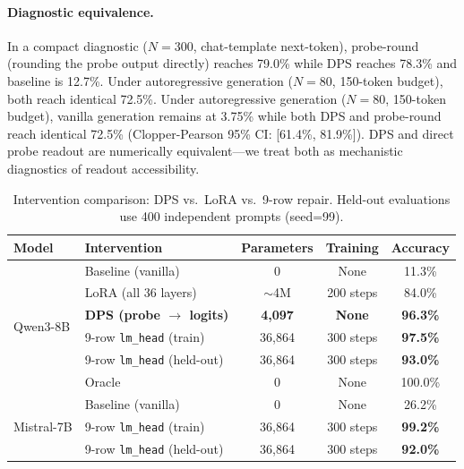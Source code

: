 \documentclass{article}
\begin{document}
\paragraph{Diagnostic equivalence.}
In a compact diagnostic ($N=300$, chat-template next-token), probe-round (rounding the probe output directly) reaches 79.0\% while DPS reaches 78.3\% and baseline is 12.7\%.
Under autoregressive generation ($N=80$, 150-token budget), both reach identical 72.5\%.
Under autoregressive generation ($N=80$, 150-token budget), vanilla generation
remains at 3.75\% while both DPS and probe-round reach identical 72.5\%
(Clopper-Pearson 95\% CI: [61.4\%, 81.9\%]).
DPS and direct probe readout are numerically equivalent---we treat both as mechanistic diagnostics of readout accessibility.

\begin{table}[h]
\centering
\caption{Intervention comparison: DPS vs.\ LoRA vs.\ 9-row repair.
Held-out evaluations use 400 independent prompts (seed=99).}
\label{tab:intervention_comparison}
\begin{tabular}{llccc}
\toprule
Model & Intervention & Parameters & Training & Accuracy \\
\midrule
\multirow{6}{*}{Qwen3-8B} & Baseline (vanilla) & 0 & None & 11.3\% \\
 & LoRA (all 36 layers) & $\sim$4M & 200 steps & 84.0\% \\
 & \textbf{DPS (probe $\to$ logits)} & \textbf{4{,}097} & \textbf{None} & \textbf{96.3\%} \\
 & 9-row \texttt{lm\_head} (train) & 36{,}864 & 300 steps & \textbf{97.5\%} \\
 & 9-row \texttt{lm\_head} (held-out) & 36{,}864 & 300 steps & \textbf{93.0\%} \\
 & Oracle & 0 & None & 100.0\% \\
\midrule
\multirow{3}{*}{Mistral-7B} & Baseline (vanilla) & 0 & None & 26.2\% \\
 & 9-row \texttt{lm\_head} (train) & 36{,}864 & 300 steps & \textbf{99.2\%} \\
 & 9-row \texttt{lm\_head} (held-out) & 36{,}864 & 300 steps & \textbf{92.0\%} \\
\bottomrule
\end{tabular}
\end{table}
\end{document}
